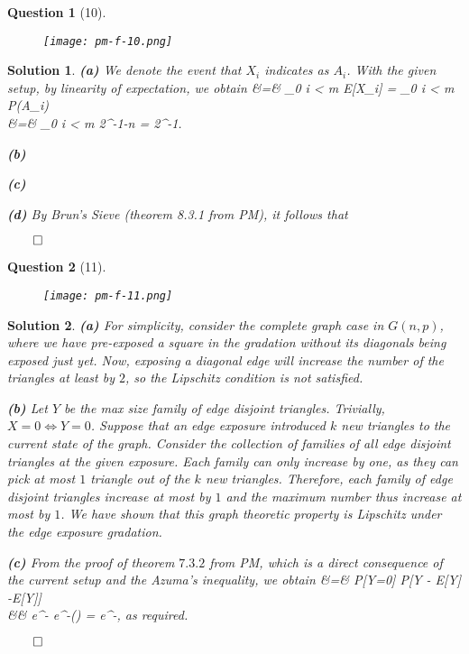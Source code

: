 \documentclass{article} %
\def\eQb#1\eQe{\begin{eqnarray*}#1\end{eqnarray*}}
\theoremstyle{quest}
\newtheorem*{question}{Question}
\newtheorem*{solution}{Solution}
\begin{document}
\newpage
\begin{question}[10]
\hfill
\begin{figure}[h!]
  \centering
    \texttt{[image: pm-f-10.png]}
\end{figure}
\end{question}
\begin{solution}
\textbf{(a)}
We denote the event that $X_i$ indicates as $A_i$.
With the given setup, by linearity of expectation, we obtain
\eQb
E[X] &=& \sum_{0 \leq i < m } E[X_i] = \sum_{0 \leq i < m} P(A_i) \\
&=& \sum_{0 \leq i < m} 2^{-1-n} = 2^{-1}. 
\eQe

\bigskip

\textbf{(b)}

\bigskip

\textbf{(c)}

\bigskip

\textbf{(d)} By Brun's Sieve (theorem 8.3.1 from PM), it follows that


\hfill $\qed$
\end{solution}
\newpage
\begin{question}[11]
\hfill
\begin{figure}[h!]
  \centering
    \texttt{[image: pm-f-11.png]}
\end{figure}
\end{question}
\begin{solution}
\textbf{(a)} For simplicity, consider the complete 
graph case in $G(n,p)$, where we have 
pre-exposed a square in the gradation without 
its diagonals being exposed just yet. Now, 
exposing a diagonal edge will increase the number
of the triangles at least by $2$, so the 
Lipschitz condition is not satisfied. 

\bigskip

\textbf{(b)}
Let $Y$ be the max size family of edge disjoint triangles. Trivially, $X = 0 \iff Y=0$. Suppose that 
an edge exposure introduced $k$ new triangles to the current state of the graph. Consider
the collection of families 
of all edge disjoint triangles at the given exposure.
Each family can only increase by one, as they can pick
at most $1$ triangle out of the $k$ new triangles. Therefore, each family of edge disjoint triangles
increase at most by $1$ and the maximum number thus increase at most by $1$. We have shown that this
graph theoretic property is Lipschitz under the edge exposure gradation. 
 
\bigskip

\textbf{(c)} From the proof of theorem $7.3.2$ from PM, which is a direct consequence of the current setup 
and the Azuma's inequality, we obtain
\eQb
P[X=0] &=& P[Y=0] \leq P[Y - E[Y] \leq -E[Y]] \\
&\leq& e^{-} \leq e^{-\Theta()} = e^{-},
\eQe
as required.

\hfill $\qed$
\end{solution}
\end{document}
